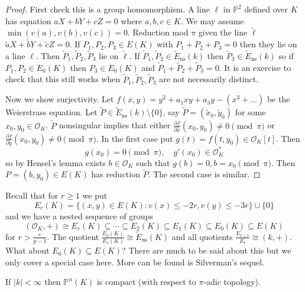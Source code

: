 \documentclass[a4paper]{article}
\theoremstyle{definition}
\renewcommand*{\P}{\mathbb{P}}
\renewcommand*{\O}{\mathcal{O}}
\begin{document}
\begin{proof}
  First check this is a group homomorphism. A line \(\ell\) in \(\P^2\) defined over \(K\) has equation \(aX + bY + cZ = 0\) where \(a, b, c \in K\). We may assume \(\min (v(a), v(b), v(c)) = 0\). Reduction mod \(\pi\) given the line \(\tilde \ell\) \(\tilde a X + \tilde b Y + \tilde c Z = 0\). If \(P_1, P_2, P_3 \in E(K)\) with \(P_1 + P_2 + P_3 = 0\) then they lie on a line \(\ell\). Then \(\widetilde P_1, \widetilde P_2, \widetilde P_3\) lie on \(\tilde \ell\). If \(\widetilde P_1, \widetilde P_2 \in \widetilde E_{\mathrm{ns}}(k)\) then \(\widetilde P_3 \in \widetilde E_{\mathrm{ns}}(k)\) so if \(P_1, P_2 \in E_0(K)\) then \(P_3 \in E_0(K)\) and \(\widetilde P_1 + \widetilde P_2 + \widetilde P_3 = 0\). It is an exercise to check that this still works when \(\widetilde P_1, \widetilde P_2, \widetilde P_3\) are not necessarily distinct.

  Now we show surjectivity. Let \(f(x, y) = y^2 + a_1xy + a_3y - (x^3 + \dots)\) be the Weierstrass equation. Let \(\widetilde P \in \widetilde E_{\mathrm{ns}}(k) \setminus \{0\}\), say \(\widetilde P = (\tilde x_0, \tilde y_0)\) for some \(x_0, y_0 \in \O_K\). \(\widetilde P\) nonsingular implies that either \(\frac{\partial f}{\partial x}(x_0, y_0) \neq 0 \pmod \pi\) or \(\frac{\partial f}{\partial y}(x_0, y_0) \neq 0 \pmod \pi\). In the first case put \(g(t) = f(t, y_0) \in \O_K[t]\). Then
  \[
    g(x_0) = 0 \pmod \pi, \quad g'(x_0) \in \O_K^*
  \]
  so by Hensel's lemma exists \(b \in \O_K\) such that \(g(b) = 0, b = x_0 \pmod \pi\). Then \(P = (b, y_0) \in E(K)\) has reduction \(\widetilde P\). The second case is similar.
\end{proof}

Recall that for \(r \geq 1\) we put
\[
  E_r(K) = \{(x, y) \in E(K): v(x) \leq -2r, v(y) \leq -3r\} \cup \{0\}
\]
and we have a nested sequence of groups
\[
  (\O_K, +) \cong E_r(K) \subseteq \cdots \subseteq E_2(K) \subseteq E_1(K) \subseteq E_0(K) \subseteq E(K)
\]
for \(r > \frac{e}{p - 1}\). The quotient \(\frac{E_0(K)}{E_1(K)} \cong \widetilde E_{\mathrm{ns}}(K)\) and all quotients \(\frac{E_{t + 1}}{E_t} \cong (k, +)\). What about \(E_0(K) \subseteq E(K)\)? There are much to be said about this but we only cover a special case here. More can be found is Silverman's sequel.

\begin{lemma}
  If \(|k| < \infty\) then \(\P^n(K)\) is compact (with respect to \(\pi\)-adic topology).
\end{lemma}
\end{document}
